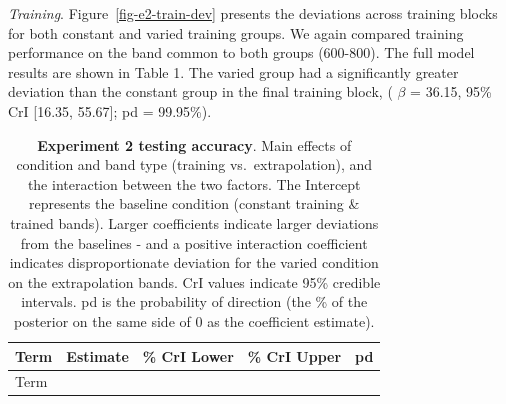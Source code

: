 \documentclass[
  11pt,
  letterpaper,
]{article}
\begin{document}
\hfill\break

\emph{Training}. Figure~\ref{fig-e2-train-dev} presents the deviations
across training blocks for both constant and varied training groups. We
again compared training performance on the band common to both groups
(600-800). The full model results are shown in Table 1. The varied group
had a significantly greater deviation than the constant group in the
final training block, ( \(\beta\) = 36.15, 95\% CrI {[}16.35, 55.67{]};
pd = 99.95\%).

\begin{longtable}[]{@{}
  >{\raggedright\arraybackslash}p{}
  >{\raggedleft\arraybackslash}p{}
  >{\raggedleft\arraybackslash}p{}
  >{\raggedleft\arraybackslash}p{}
  >{\raggedleft\arraybackslash}p{}@{}}
\caption{\textbf{Experiment 2 testing accuracy}. Main effects of
condition and band type (training vs.~extrapolation), and the
interaction between the two factors. The Intercept represents the
baseline condition (constant training \& trained bands). Larger
coefficients indicate larger deviations from the baselines - and a
positive interaction coefficient indicates disproportionate deviation
for the varied condition on the extrapolation bands. CrI values indicate
95\% credible intervals. pd is the probability of direction (the \% of
the posterior on the same side of 0 as the coefficient
estimate).}\label{tbl-e2-bmm-dist}\tabularnewline
\toprule\noalign{}
\begin{minipage}[b]{\linewidth}\raggedright
Term
\end{minipage} & \begin{minipage}[b]{\linewidth}\raggedleft
Estimate
\end{minipage} & \begin{minipage}[b]{\linewidth}\raggedleft
95\% CrI Lower
\end{minipage} & \begin{minipage}[b]{\linewidth}\raggedleft
95\% CrI Upper
\end{minipage} & \begin{minipage}[b]{\linewidth}\raggedleft
pd
\end{minipage} \\
\midrule\noalign{}
\endfirsthead
\toprule\noalign{}
\begin{minipage}[b]{\linewidth}\raggedright
Term
\end{minipage} & \begin{minipage}[b]{\linewidth}\raggedleft

\end{minipage}
\end{longtable}
\end{document}
